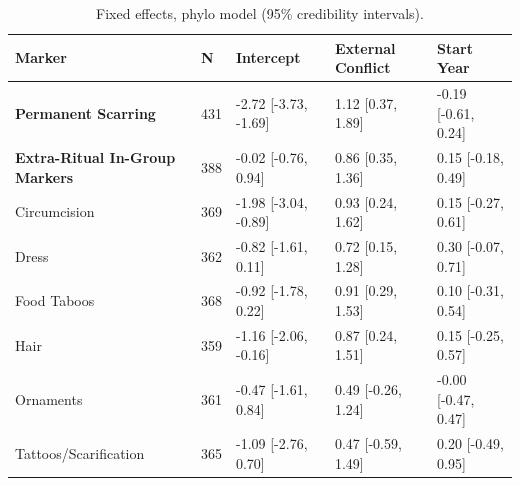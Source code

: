 \begin{table}[!ht]
\centering
\small
\caption{Fixed effects, phylo model (95\% credibility intervals).}
\label{tab:ext_fixed_effects_phylo}
\begin{tabular}{p{4cm}llll}
\toprule
Marker & N & Intercept & External Conflict & Start Year \\
\midrule
\textbf{Permanent Scarring} & 431 & -2.72 [-3.73, -1.69] & 1.12 [0.37, 1.89] & -0.19 [-0.61, 0.24] \\
\textbf{Extra-Ritual In-Group Markers} & 388 & -0.02 [-0.76, 0.94] & 0.86 [0.35, 1.36] & 0.15 [-0.18, 0.49] \\
\midrule
Circumcision & 369 & -1.98 [-3.04, -0.89] & 0.93 [0.24, 1.62] & 0.15 [-0.27, 0.61] \\
Dress & 362 & -0.82 [-1.61, 0.11] & 0.72 [0.15, 1.28] & 0.30 [-0.07, 0.71] \\
Food Taboos & 368 & -0.92 [-1.78, 0.22] & 0.91 [0.29, 1.53] & 0.10 [-0.31, 0.54] \\
Hair & 359 & -1.16 [-2.06, -0.16] & 0.87 [0.24, 1.51] & 0.15 [-0.25, 0.57] \\
Ornaments & 361 & -0.47 [-1.61, 0.84] & 0.49 [-0.26, 1.24] & -0.00 [-0.47, 0.47] \\
Tattoos/Scarification & 365 & -1.09 [-2.76, 0.70] & 0.47 [-0.59, 1.49] & 0.20 [-0.49, 0.95] \\
\bottomrule
\end{tabular}
\end{table}